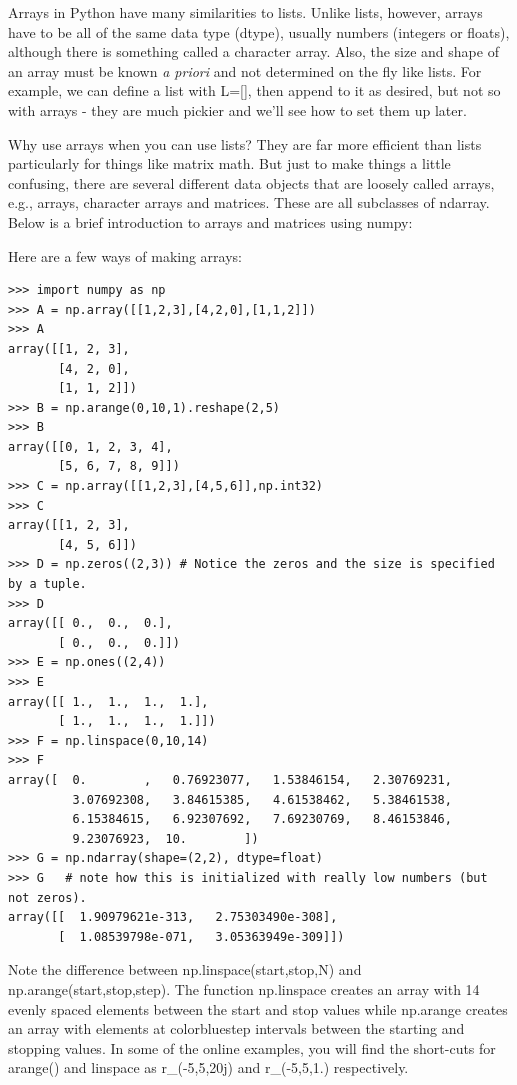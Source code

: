 \documentclass[11pt]{book}
\begin{document}
{{{{Arrays in Python  have many similarities  to  lists.
Unlike lists, however,  arrays have to be all of the same data type (dtype), usually numbers (integers or floats), although there is something called a character array.  Also, the size and shape of an array must be known {\it a priori} and not determined on the fly like lists. For example, we can define a list with {\color{blue}L=[]}, then append to it as desired, but not so with arrays - they are much pickier and we'll see how to set them up later.

Why use arrays when you can use lists?  They are far more efficient than lists particularly for things like matrix math.   But just to make things a little confusing, there are  several different data objects that are loosely called arrays, e.g., arrays, character arrays and matrices.  These are all subclasses of ndarray.  Below is a brief introduction to arrays and matrices using numpy:

 Here are a few ways of making arrays:
{ \color{blue} \begin{verbatim}
>>> import numpy as np
>>> A = np.array([[1,2,3],[4,2,0],[1,1,2]])
>>> A
array([[1, 2, 3],
       [4, 2, 0],
       [1, 1, 2]])
>>> B = np.arange(0,10,1).reshape(2,5)
>>> B
array([[0, 1, 2, 3, 4],
       [5, 6, 7, 8, 9]])
>>> C = np.array([[1,2,3],[4,5,6]],np.int32)
>>> C
array([[1, 2, 3],
       [4, 5, 6]])
>>> D = np.zeros((2,3)) # Notice the zeros and the size is specified by a tuple.
>>> D
array([[ 0.,  0.,  0.],
       [ 0.,  0.,  0.]])
>>> E = np.ones((2,4))
>>> E
array([[ 1.,  1.,  1.,  1.],
       [ 1.,  1.,  1.,  1.]])
>>> F = np.linspace(0,10,14)
>>> F
array([  0.        ,   0.76923077,   1.53846154,   2.30769231,
         3.07692308,   3.84615385,   4.61538462,   5.38461538,
         6.15384615,   6.92307692,   7.69230769,   8.46153846,
         9.23076923,  10.        ])
>>> G = np.ndarray(shape=(2,2), dtype=float)
>>> G   # note how this is initialized with really low numbers (but not zeros).
array([[  1.90979621e-313,   2.75303490e-308],
       [  1.08539798e-071,   3.05363949e-309]])
\end{verbatim}}

Note the difference between {\color{blue}np.linspace(start,stop,N)} and {\color{blue}np.arange(start,stop,step)}. The function {\color{blue}np.linspace} creates an array with 14 evenly spaced elements between the start and stop values while  {\color{blue}np.arange} creates an array with elements at {color{blue}step} intervals between the starting and stopping values.    In some of the online examples, you will find the short-cuts for {\color{blue}arange()} and {\color{blue}linspace} as  {\color{blue}r\_(-5,5,20j)} and {\color{blue}r\_(-5,5,1.)} respectively.

}}}}
\end{document}
